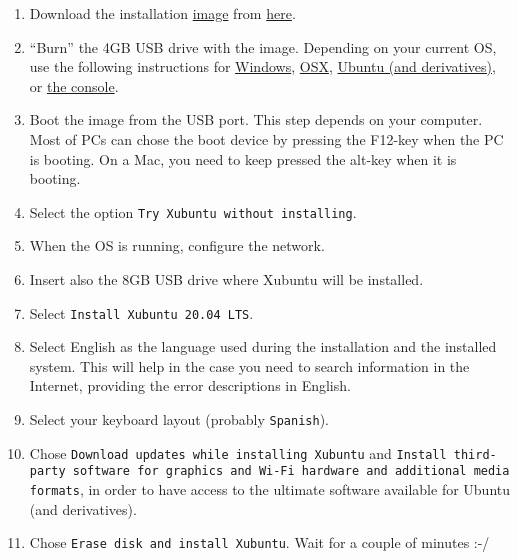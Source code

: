 \begin{enumerate}
  \item Download the
    installation \href{https://en.wikipedia.org/wiki/Disk_image}{image}
    from \href{https://xubuntu.org/download/}{here}.
    
  \item ``Burn'' the 4GB USB drive with the image. Depending on your
    current OS, use the following instructions
    for \href{https://ubuntu.com/tutorials/create-a-usb-stick-on-windows#1-overview}{Windows}, \href{https://ubuntu.com/tutorials/create-a-usb-stick-on-macos#1-overview}{OSX}, \href{https://ubuntu.com/tutorials/create-a-usb-stick-on-ubuntu#1-overview}{Ubuntu
    (and derivatives)},
    or \href{https://askubuntu.com/questions/372607/how-to-create-a-bootable-ubuntu-usb-flash-drive-from-terminal}{the
    console}.

\item Boot the image from the USB port. This step depends on your
  computer. Most of PCs can chose the boot device by pressing the
  F12-key when the PC is booting. On a Mac, you need to keep pressed
  the alt-key when it is booting.
  
\item Select the option \texttt{Try Xubuntu without installing}.
  
\item When the OS is running, configure the network.
  
\item Insert also the 8GB USB drive where Xubuntu will be installed.
  
\item Select \texttt{Install Xubuntu 20.04 LTS}.
  
\item Select English as the language used during the installation and the
  installed system. This will help in the case you need to search
  information in the Internet, providing the error descriptions in
  English.
  
\item Select your keyboard layout (probably \texttt{Spanish}).

\item Chose \texttt{Download updates while installing Xubuntu} and
  \texttt{Install third-party software for graphics and Wi-Fi hardware
    and additional media formats}, in order to have access to the
    ultimate software available for Ubuntu (and derivatives).

\item Chose \texttt{Erase disk and install Xubuntu}. Wait for a couple
  of minutes :-/


\end{enumerate}
